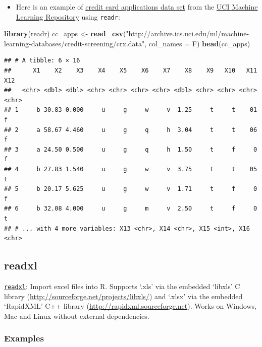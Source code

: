 \documentclass[]{book}
\newenvironment{Shaded}{\begin{snugshade}}{\end{snugshade}}
\newcommand{\KeywordTok}[1]{\textcolor[rgb]{0.13,0.29,0.53}{\textbf{{#1}}}}
\newcommand{\DataTypeTok}[1]{\textcolor[rgb]{0.13,0.29,0.53}{{#1}}}
\newcommand{\StringTok}[1]{\textcolor[rgb]{0.31,0.60,0.02}{{#1}}}
\newcommand{\NormalTok}[1]{{#1}}
\providecommand{\tightlist}{%
  \setlength{\itemsep}{0pt}\setlength{\parskip}{0pt}}
\begin{document}
\begin{itemize}
\tightlist
\item
  Here is an example of
  \href{http://archive.ics.uci.edu/ml/datasets/Credit+Approval}{credit
  card applications data set} from the
  \href{http://archive.ics.uci.edu/ml/index.html}{UCI Machine Learning
  Repository} using \texttt{readr}:
\end{itemize}

\begin{Shaded}
\begin{Highlighting}[]
\KeywordTok{library}\NormalTok{(readr)}
\NormalTok{cc_apps <-}\StringTok{ }\KeywordTok{read_csv}\NormalTok{(}\StringTok{"http://archive.ics.uci.edu/ml/machine-learning-databases/credit-screening/crx.data"}\NormalTok{, }\DataTypeTok{col_names =} \NormalTok{F)}
\KeywordTok{head}\NormalTok{(cc_apps)}
\end{Highlighting}
\end{Shaded}

\begin{verbatim}
## # A tibble: 6 × 16
##      X1    X2    X3    X4    X5    X6    X7    X8    X9   X10   X11   X12
##   <chr> <dbl> <dbl> <chr> <chr> <chr> <chr> <dbl> <chr> <chr> <chr> <chr>
## 1     b 30.83 0.000     u     g     w     v  1.25     t     t    01     f
## 2     a 58.67 4.460     u     g     q     h  3.04     t     t    06     f
## 3     a 24.50 0.500     u     g     q     h  1.50     t     f     0     f
## 4     b 27.83 1.540     u     g     w     v  3.75     t     t    05     t
## 5     b 20.17 5.625     u     g     w     v  1.71     t     f     0     f
## 6     b 32.08 4.000     u     g     m     v  2.50     t     f     0     t
## # ... with 4 more variables: X13 <chr>, X14 <chr>, X15 <int>, X16 <chr>
\end{verbatim}

\subsection{\texorpdfstring{\textbf{readxl }}{readxl }}\label{readxl}

\href{https://cran.r-project.org/package=readxl}{\texttt{readxl}}:
Import excel files into R. Supports `.xls' via the embedded `libxls' C
library (\url{http://sourceforge.net/projects/libxls/}) and `.xlsx' via
the embedded `RapidXML' C++ library
(\url{http://rapidxml.sourceforge.net}). Works on Windows, Mac and Linux
without external dependencies.

\subsubsection{\texorpdfstring{\textbf{Examples
}}{Examples }}\label{examples-1}
\end{document}
